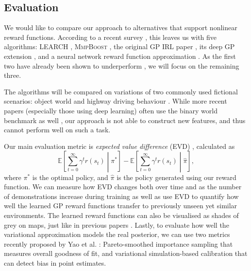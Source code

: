 \documentclass{mprop}
\theoremstyle{definition}
\begin{document}
\subsection{Evaluation} \label{sec:evaluation}

We would like to compare our approach to alternatives that support nonlinear
reward functions. According to a recent survey
\cite{DBLP:journals/corr/abs-1806-06877}, this leaves us with five algorithms:
\textsc{LEARCH} \cite{DBLP:journals/arobots/RatliffSB09}, \textsc{MmpBoost}
\cite{DBLP:conf/nips/RatliffBBC06}, the original GP IRL paper
\cite{DBLP:conf/nips/LevinePK11}, its deep GP extension
\cite{DBLP:conf/uai/JinDAS17}, and a neural network reward function
approximation \cite{wulfmeier2015maximum}. As the first two have already been
shown to underperform \cite{DBLP:conf/nips/LevinePK11}, we will focus on the
remaining three.

The algorithms will be compared on variations of two commonly used fictional
scenarios: object world \cite{DBLP:conf/nips/LevinePK11} and highway driving
behaviour \cite{DBLP:conf/icml/PieterN04,DBLP:conf/nips/LevinePK10}. While more
recent papers (especially those using deep learning) often use the binary world
benchmark as well \cite{DBLP:conf/uai/JinDAS17,wulfmeier2015maximum}, our
approach is not able to construct new features, and thus cannot perform well on
such a task.

Our main evaluation metric is \emph{expected value difference} (EVD)
\cite{DBLP:conf/uai/JinDAS17}, calculated as
\[ \mathbb{E} \left[ \sum_{t=0}^\infty \gamma^tr(s_t) \middle| \pi^* \right] -
  \mathbb{E} \left[ \sum_{t=0}^\infty \gamma^t r(s_t) \middle| \hat\pi
  \right], \]
where $\pi^*$ is the optimal policy, and $\hat\pi$ is the policy generated using
our reward function. We can measure how EVD changes both over time and as the
number of demonstrations increase during training as well as use EVD to quantify
how well the learned GP reward functions transfer to previously unseen yet
similar environments. The learned reward functions can also be visualised as
shades of grey on maps, just like in previous papers
\cite{DBLP:conf/uai/JinDAS17,DBLP:conf/nips/LevinePK11}. Lastly, to evaluate how
well the variational approximation models the real posterior, we can use two
metrics recently proposed by Yao et al. \cite{DBLP:conf/icml/YaoVSG18}:
Pareto-smoothed importance sampling that measures overall goodness of fit, and
variational simulation-based calibration that can detect bias in point
estimates.



\end{document}
